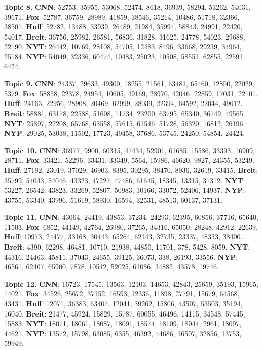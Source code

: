 \documentclass[11pt]{article}
\begin{document}
\textbf{Topic 8.}
\textbf{CNN}: 52753, 35955, 53068, 52474, 8618, 36939, 58294, 53262, 54031, 39671.
\textbf{Fox}: 52787, 36759, 28989, 41859, 38546, 35214, 10486, 51718, 32366, 38501.
\textbf{Huff}: 52782, 13488, 33939, 26489, 21984, 35994, 58843, 24991, 22420, 54017.
\textbf{Breit}: 36756, 25982, 26581, 56836, 31828, 31625, 24778, 54023, 29688, 22190.
\textbf{NYT}: 26442, 10769, 28108, 54705, 12483, 8496, 33668, 29239, 34964, 25184.
\textbf{NYP}: 54049, 32336, 60474, 10483, 25023, 10508, 58551, 62855, 22591, 6424.

\textbf{Topic 9.}
\textbf{CNN}: 24337, 29633, 49300, 18255, 21561, 63481, 65460, 12850, 22029, 5379.
\textbf{Fox}: 58858, 22378, 24954, 10605, 49169, 28970, 42046, 22859, 17031, 22101.
\textbf{Huff}: 24163, 22956, 28908, 20469, 62999, 28039, 22394, 64592, 22044, 49612.
\textbf{Breit}: 58881, 63178, 22588, 51608, 11734, 23200, 63795, 65340, 36749, 49565.
\textbf{NYT}: 25897, 22208, 65768, 63558, 57615, 61546, 51728, 56320, 16812, 26196.
\textbf{NYP}: 29025, 53038, 11502, 17723, 49458, 37686, 53745, 24250, 54854, 24424.


\textbf{Topic 10.}
\textbf{CNN}: 36977, 9900, 60315, 47434, 52901, 61685, 15586, 33393, 16909, 28711.
\textbf{Fox}: 33421, 52296, 33431, 33349, 5564, 15986, 46620, 9827, 24355, 53249.
\textbf{Huff}: 27192, 23019, 37029, 46903, 8395, 30295, 38470, 8936, 32619, 33415.
\textbf{Breit}: 35799, 54043, 54046, 43323, 47227, 47486, 61645, 18345, 13315, 31312.
\textbf{NYT}: 53227, 26542, 43823, 33269, 52807, 50983, 10166, 33072, 52406, 14937.
\textbf{NYP}: 43755, 53340, 43996, 51619, 58930, 16594, 32531, 48513, 60137, 37131.


\textbf{Topic 11.}
\textbf{CNN}: 43064, 24419, 43853, 37234, 24293, 62395, 60856, 37716, 65640, 11503.
\textbf{Fox}: 6852, 44149, 42764, 26980, 37265, 34316, 65050, 28248, 42912, 22639.
\textbf{Huff}: 10973, 24477, 33168, 30443, 65264, 62143, 32735, 23337, 48333, 38400.
\textbf{Breit}: 4390, 62298, 46481, 10710, 21938, 44850, 11701, 378, 5428, 8059.
\textbf{NYT}: 44316, 24463, 45811, 37043, 24655, 39125, 36073, 338, 26193, 33556.
\textbf{NYP}: 46561, 62407, 65900, 7878, 10542, 52025, 61086, 34882, 43578, 19746.


\textbf{Topic 12.}
\textbf{CNN}: 16723, 17545, 13563, 12103, 14653, 42843, 25659, 35193, 15965, 14021.
\textbf{Fox}: 34526, 25672, 37152, 16593, 12336, 11898, 27791, 15679, 64568, 43431.
\textbf{Huff}: 12071, 36383, 63407, 12041, 39262, 15806, 43507, 53503, 35194, 16040.
\textbf{Breit}: 21477, 45924, 15829, 15787, 60055, 46496, 14115, 34548, 57445, 15883.
\textbf{NYT}: 18071, 18061, 18087, 18091, 18574, 18109, 18044, 2961, 18097, 44621.
\textbf{NYP}: 13572, 15798, 63085, 6355, 46392, 44686, 16507, 32856, 13753, 59949.
\end{document}
